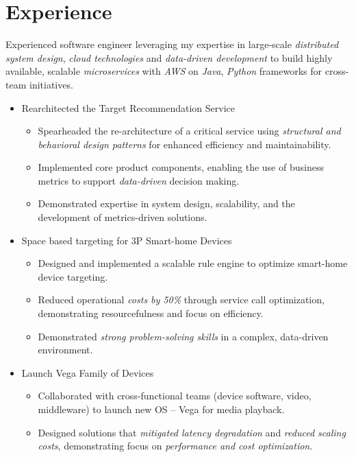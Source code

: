 \section{Experience}
{Experienced software engineer leveraging my expertise in large-scale \textit{distributed system design}, \textit{cloud technologies} 
and \textit{data-driven development} to build highly available, scalable \textit{microservices} with 
\textit{AWS} on \textit{Java}, \textit{Python} frameworks for cross-team initiatives.\newline{}
\begin{itemize}
\setlength\itemsep{1em}
    \item Rearchitected the Target Recommendation Service
        \begin{itemize}
            \item Spearheaded the re-architecture of a critical service using \textit{structural and behavioral design patterns} for enhanced efficiency and maintainability.
            \item Implemented core product components, enabling the use of business metrics to support \textit{data-driven} decision making.
            \item Demonstrated expertise in system design, scalability, and the development of metrics-driven solutions.
        \end{itemize}
    \item Space based targeting for 3P Smart-home Devices
    \begin{itemize}
        \item Designed and implemented a scalable rule engine to optimize smart-home device targeting.
        \item Reduced operational \textit{costs by 50\%} through service call optimization, demonstrating resourcefulness and focus on efficiency.
        \item Demonstrated \textit{strong problem-solving skills} in a complex, data-driven environment.
    \end{itemize}
    \item Launch Vega Family of Devices
        \begin{itemize}
            \item Collaborated with cross-functional teams (device software, video, middleware) to launch new OS -- Vega for media playback.
            \item Designed solutions that \textit{mitigated latency degradation} and \textit{reduced scaling costs}, demonstrating focus on \textit{performance and cost optimization}.

\end{itemize}
\end{itemize}}
